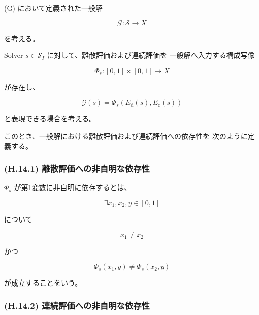 \documentclass[a4paper,11pt]{article}
\begin{document}
(G) において定義された一般解

\begin{equation}
    \mathcal{G}:
    \mathcal{S}
    \longrightarrow
    X
\end{equation}

を考える。

Solver $s\in\mathcal{S}_I$ に対して、離散評価および連続評価を
一般解へ入力する構成写像

\begin{equation}
    \Phi_s:
    [0,1]\times[0,1]
    \longrightarrow
    X
\end{equation}

が存在し、

\begin{equation}
    \boxed{
        \mathcal{G}(s)
        =
        \Phi_s
        \left(
            E_{\mathrm d}(s),
            E_{\mathrm c}(s)
        \right)
    }
    \label{eq:H-general-solution-two-evaluations}
\end{equation}

と表現できる場合を考える。

このとき、一般解における離散評価および連続評価への依存性を
次のように定義する。


\subsubsection{(H.14.1) 離散評価への非自明な依存性}
\label{subsubsec:H14-1}

$\Phi_s$ が第1変数に非自明に依存するとは、

\begin{equation}
    \exists x_1,x_2,y\in[0,1]
\end{equation}

について

\begin{equation}
    x_1\neq x_2
\end{equation}

かつ

\begin{equation}
    \boxed{
        \Phi_s(x_1,y)
        \neq
        \Phi_s(x_2,y)
    }
    \label{eq:H-nontrivial-discrete}
\end{equation}

が成立することをいう。


\subsubsection{(H.14.2) 連続評価への非自明な依存性}
\label{subsubsec:H14-2}
\end{document}
